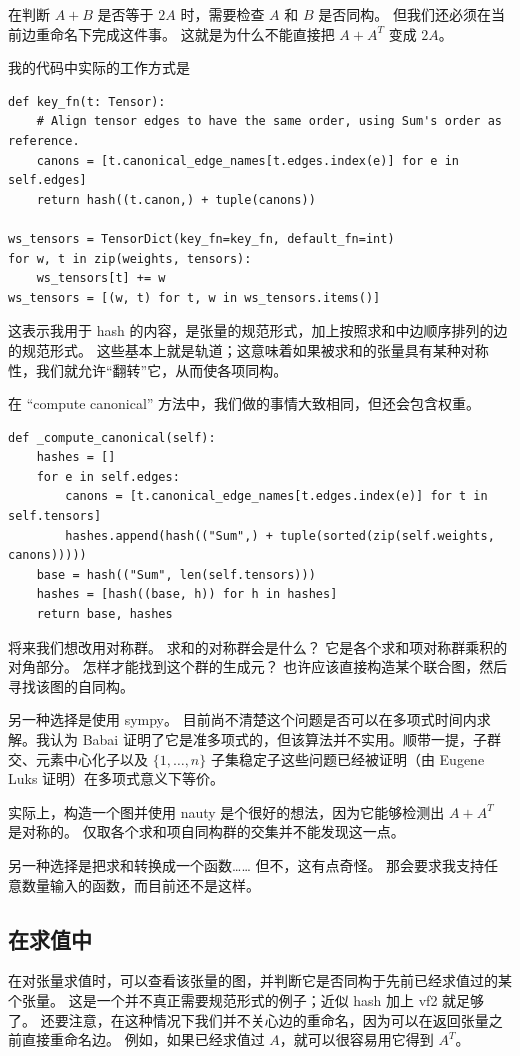 在判断 $A + B$ 是否等于 $2A$ 时，需要检查 $A$ 和 $B$ 是否同构。
但我们还必须在当前边重命名下完成这件事。
这就是为什么不能直接把 $A + A^T$ 变成 $2A$。

我的代码中实际的工作方式是
\begin{lstlisting}
def key_fn(t: Tensor):
    # Align tensor edges to have the same order, using Sum's order as reference.
    canons = [t.canonical_edge_names[t.edges.index(e)] for e in self.edges]
    return hash((t.canon,) + tuple(canons))

ws_tensors = TensorDict(key_fn=key_fn, default_fn=int)
for w, t in zip(weights, tensors):
    ws_tensors[t] += w
ws_tensors = [(w, t) for t, w in ws_tensors.items()]
\end{lstlisting}
这表示我用于 hash 的内容，是张量的规范形式，加上按照求和中边顺序排列的边的规范形式。
这些基本上就是轨道；这意味着如果被求和的张量具有某种对称性，我们就允许“翻转”它，从而使各项同构。

在 “compute canonical” 方法中，我们做的事情大致相同，但还会包含权重。
\begin{lstlisting}
def _compute_canonical(self):
    hashes = []
    for e in self.edges:
        canons = [t.canonical_edge_names[t.edges.index(e)] for t in self.tensors]
        hashes.append(hash(("Sum",) + tuple(sorted(zip(self.weights, canons)))))
    base = hash(("Sum", len(self.tensors)))
    hashes = [hash((base, h)) for h in hashes]
    return base, hashes
\end{lstlisting}

将来我们想改用对称群。
求和的对称群会是什么？
它是各个求和项对称群乘积的对角部分。
怎样才能找到这个群的生成元？
也许应该直接构造某个联合图，然后寻找该图的自同构。

另一种选择是使用 sympy。
目前尚不清楚这个问题是否可以在多项式时间内求解。我认为 Babai 证明了它是准多项式的，但该算法并不实用。顺带一提，子群交、元素中心化子以及 $\{1, \dots, n\}$ 子集稳定子这些问题已经被证明（由 Eugene Luks 证明）在多项式意义下等价。


实际上，构造一个图并使用 nauty 是个很好的想法，因为它能够检测出 $A+A^T$ 是对称的。
仅取各个求和项自同构群的交集并不能发现这一点。

另一种选择是把求和转换成一个函数……
但不，这有点奇怪。
那会要求我支持任意数量输入的函数，而目前还不是这样。



\subsection{在求值中}
在对张量求值时，可以查看该张量的图，并判断它是否同构于先前已经求值过的某个张量。
这是一个并不真正需要规范形式的例子；近似 hash 加上 vf2 就足够了。
还要注意，在这种情况下我们并不关心边的重命名，因为可以在返回张量之前直接重命名边。
例如，如果已经求值过 $A$，就可以很容易用它得到 $A^T$。

